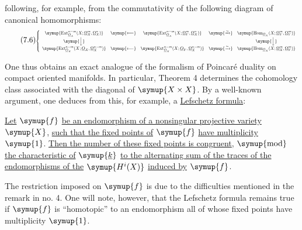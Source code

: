 following, for example, from the commutativity of the following diagram of
canonical homomorphisms:
\begin{equation}\tag{7.6}
\resizebox{\textwidth}{!}{$
\left\{
\begin{array}{ccccc}
\symup{\operatorname{Ext}_{\Osh_X}^{n-m}(X;\underline{\Omega}_X^{m},\underline{\Omega}_X^{n})}
&
\symup{\longleftarrow}
&
\symup{\operatorname{Ext}_{\Osh_X}^{n-m}(X;\underline{\Omega}_Y^{m},\underline{\Omega}_X^{n})}
&
\symup{\xrightarrow{\sim}}
&
\symup{\operatorname{Hom}_{\Osh_X}(X;\underline{\Omega}_Y^{m},\underline{\Omega}_Y^{m})}
\\[3pt]
\symup{\Big\downarrow}
&&&&
\symup{\Big\downarrow}
\\[3pt]
\symup{\operatorname{Ext}_{\Osh_X}^{n-m}(X;\Osh_X,\underline{\Omega}_X^{n-m})}
&
\symup{\longleftarrow}
&
\symup{\operatorname{Ext}_{\Osh_X}^{n-m}(X;\Osh_Y,\underline{\Omega}_X^{n-m})}
&
\symup{\xrightarrow{\sim}}
&
\symup{\operatorname{Hom}_{\Osh_X}(X;\underline{\Omega}_X^{m},\underline{\Omega}_Y^{m})}
\end{array}
\right.
$}
\end{equation}

One thus obtains an exact analogue of the formalism of Poincaré duality on compact
oriented manifolds. In particular, Theorem 4 determines the cohomology class
associated with the diagonal of $\symup{X\times X}$. By a well-known argument, one deduces from this,
for example, a \uline{Lefschetz formula}:

 \uline{Let} $\symup{f}$ \uline{be an endomorphism of a nonsingular projective
variety} $\symup{X}$, \uline{such that the fixed points of} $\symup{f}$ \uline{have multiplicity} $\symup{1}$. \uline{Then the number of
these fixed points is congruent}, $\symup{\operatorname{mod}}$ \uline{the characteristic of} $\symup{\underline{k}}$ \uline{to the
alternating sum of the traces of the endomorphisms of the} $\symup{H^{i}(X)}$ \uline{induced by}
$\symup{f}$.

The restriction imposed on $\symup{f}$ is due to the difficulties mentioned in the
remark in no. 4. One will note, however, that the Lefschetz formula remains true if
$\symup{f}$ is ``homotopic'' to an endomorphism all of whose fixed points have
multiplicity $\symup{1}$.


